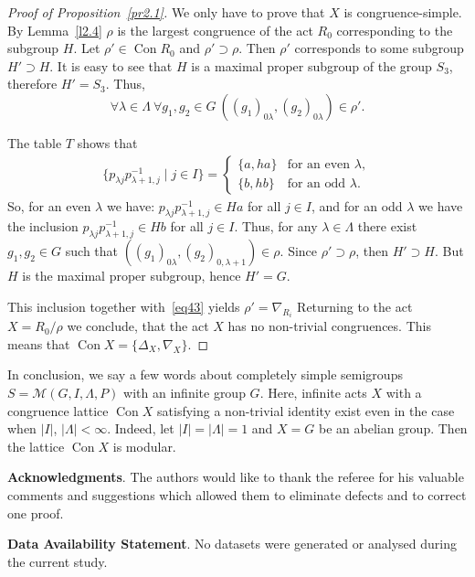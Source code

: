 \documentclass{birkau}
\numberwithin{equation}{section}
\theoremstyle{plain}
\theoremstyle{definition}
\DeclareMathOperator{\Con}{Con}
\begin{document}
\begin{proof}[Proof of Proposition~\ref{pr2.1}]
		We only have to prove that $X$ is congruence-simple. By Lemma~\ref{l2.4} $\rho$ is the largest congruence of the act $R_0$ corresponding to the subgroup $H$. Let $\rho' \in \Con R_0$ and $\rho' \supset \rho$. Then $\rho'$ corresponds to some subgroup $H' \supset H$. It is easy to see that $H$ is a maximal proper subgroup of the group $S_3$, therefore $H' = S_3$. Thus,
		\begin{equation}
		    \forall \lambda \in \Lambda \ \forall g_1,g_2 \in G \ ((g_1)_{0 \lambda},(g_2)_{0 \lambda}) \in \rho'. \label{eq43}
		\end{equation}
		
		The table $T$ shows that
		\begin{gather*}
		\{ p_{\lambda j} p_{\lambda+1,j}^{-1} \mid j \in I \} =
			\begin{cases}
				\{a, ha\} & \text{for an even $\lambda$},\\
				\{b, hb\} & \text{for an odd $\lambda$}.
			\end{cases}
		\end{gather*}
		So, for an even $\lambda$ we have: $p_{\lambda j} p_{\lambda+1,j}^{-1} \in Ha$ for all $j \in I$, and for an odd $\lambda$ we have the inclusion $p_{\lambda j} p_{\lambda+1,j}^{-1} \in Hb$ for all $j \in I$. Thus, for any $\lambda \in \Lambda$ there exist $g_1,g_2 \in G$ such that $((g_1)_{0 \lambda},(g_2)_{0,\lambda+1}) \in \rho$.
		Since $\rho' \supset \rho$, then $H' \supset H$. But $H$ is the maximal proper subgroup, hence $H' = G$.
		
		This inclusion together with~\eqref{eq43} yields $\rho' = \nabla_{R_i}$ Returning to the act $X = {R_0}/{\rho}$ we conclude, that the act $X$ has no non-trivial congruences. This means that $\Con X = \{ \Delta_X,\nabla_X \}$.
	\end{proof}
	
	In conclusion, we say a few words about completely simple semigroups $S = \mathcal{M}(G,I,\Lambda,P)$ with an infinite group $G$. Here, infinite acts $X$ with a congruence lattice $\Con X$ satisfying a non-trivial identity exist even in the case when $|I|$, $|\Lambda| < \infty$. Indeed, let $|I| = |\Lambda| = 1$ and $X=G$ be an abelian group. Then the lattice $\Con X$ is modular.
	
	{\bf Acknowledgments}. The authors would like to thank the referee for his valuable comments and suggestions which allowed them to eliminate defects and to correct one proof.
	
	{\bf Data Availability Statement}. No datasets were generated or analysed during the current study.
	
\end{document}
